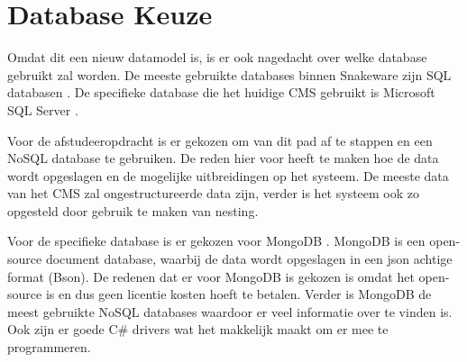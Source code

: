 \section{Database Keuze}
Omdat dit een nieuw datamodel is, is er ook nagedacht over welke database gebruikt zal worden.
De meeste gebruikte databases binnen Snakeware zijn SQL databasen \parencite{SQL}. 
De specifieke database die het huidige CMS gebruikt is Microsoft SQL Server \parencite{MSQLServer}.

\whitespace
Voor de afstudeeropdracht is er gekozen om van dit pad af te stappen en een NoSQL \parencite{NoSQL} database te gebruiken.
De reden hier voor heeft te maken hoe de data wordt opgeslagen en de mogelijke uitbreidingen op het systeem.
De meeste data van het CMS zal ongestructureerde data zijn, verder is het systeem ook zo opgesteld door gebruik te maken van nesting.

\whitespace
Voor de specifieke database is er gekozen voor MongoDB \parencite{MongoDB}.
MongoDB is een open-source document database, waarbij de data wordt opgeslagen in een json achtige format (Bson).
De redenen dat er voor MongoDB is gekozen is omdat het open-source is en dus geen licentie kosten hoeft te betalen.
Verder is MongoDB de meest gebruikte NoSQL databases waardoor er veel informatie over te vinden is.
Ook zijn er goede C\# drivers wat het makkelijk maakt om er mee te programmeren.

